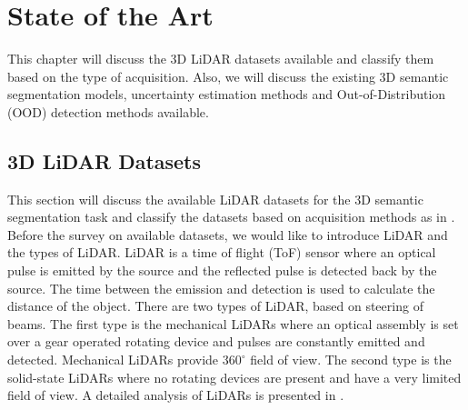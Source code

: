 

    \chapter{State of the Art}
    This chapter will discuss the 3D LiDAR datasets available and classify them based on the type of acquisition.
    Also, we will discuss the existing 3D semantic segmentation models, uncertainty estimation methods and Out-of-Distribution (OOD) detection methods available.
    \section{3D LiDAR Datasets}
    This section will discuss the available LiDAR datasets for the 3D semantic segmentation task and classify the datasets based on acquisition methods as in \cite{survey3d}.
    Before the survey on available datasets, we would like to introduce LiDAR and the types of LiDAR.
    LiDAR is a time of flight (ToF) sensor where an optical pulse is emitted by the source and the reflected pulse is detected back by the source.
    The time between the emission and detection is used to calculate the distance of the object.
    There are two types of LiDAR, based on steering of beams.
    The first type is the mechanical LiDARs where an optical assembly is set over a gear operated rotating device and pulses are constantly emitted and detected.
    Mechanical LiDARs provide $360^{\circ}$ field of view.
    The second type is the solid-state LiDARs where no rotating devices are present and have a very limited field of view. 
    A detailed analysis of LiDARs is presented in \cite{lidar}.


